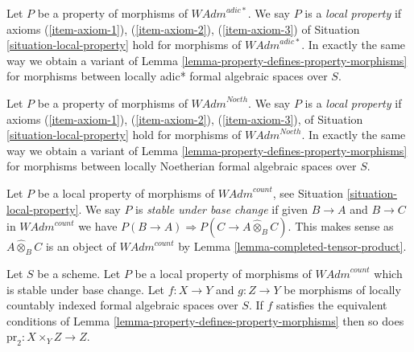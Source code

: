 \begin{remark}
\label{remark-variant-adic-star}
Let $P$ be a property of morphisms of $\textit{WAdm}^{adic*}$.
We say $P$ is a {\it local property} if axioms
(\ref{item-axiom-1}), (\ref{item-axiom-2}), (\ref{item-axiom-3})
of Situation \ref{situation-local-property}
hold for morphisms of $\textit{WAdm}^{adic*}$. In exactly the same way
we obtain a variant of Lemma \ref{lemma-property-defines-property-morphisms}
for morphisms between locally adic* formal algebraic spaces over $S$.
\end{remark}

\begin{remark}
\label{remark-variant-Noetherian}
Let $P$ be a property of morphisms of $\textit{WAdm}^{Noeth}$.
We say $P$ is a {\it local property} if axioms
(\ref{item-axiom-1}), (\ref{item-axiom-2}), (\ref{item-axiom-3}),
of Situation \ref{situation-local-property}
hold for morphisms of $\textit{WAdm}^{Noeth}$. In exactly the same way
we obtain a variant of Lemma \ref{lemma-property-defines-property-morphisms}
for morphisms between locally Noetherian formal algebraic spaces over $S$.
\end{remark}

\begin{situation}
\label{situation-base-change-local-property}
Let $P$ be a local property of morphisms of $\textit{WAdm}^{count}$, see
Situation \ref{situation-local-property}. We say $P$ is {\it stable under
base change} if given $B \to A$ and $B \to C$ in $\textit{WAdm}^{count}$
we have $P(B \to A) \Rightarrow P(C \to A \widehat{\otimes}_B C)$.
This makes sense as $A \widehat{\otimes}_B C$ is an object of
$\textit{WAdm}^{count}$ by Lemma \ref{lemma-completed-tensor-product}.
\end{situation}

\begin{lemma}
\label{lemma-base-change-property-morphisms}
Let $S$ be a scheme. Let $P$ be a local property of morphisms of
$\textit{WAdm}^{count}$ which is stable under base change.
Let $f : X \to Y$ and $g : Z \to Y$ be morphisms of locally countably indexed
formal algebraic spaces over $S$. If $f$ satisfies the equivalent conditions of
Lemma \ref{lemma-property-defines-property-morphisms}
then so does $\text{pr}_2 : X \times_Y Z \to Z$.
\end{lemma}

